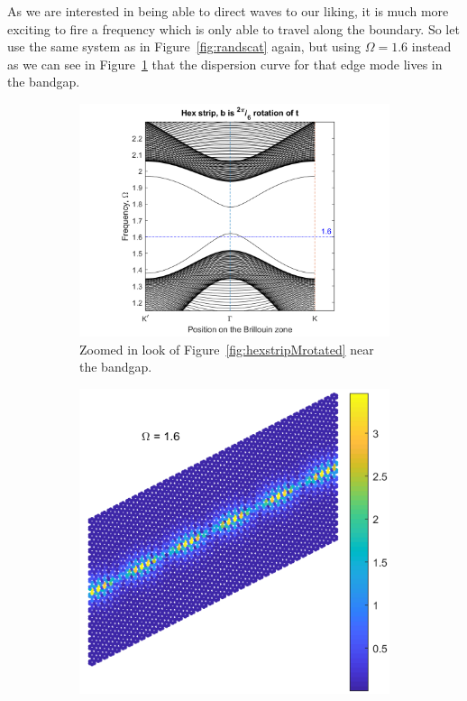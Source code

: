 As we are interested in being able to direct waves to our liking, it is much
more exciting to fire a frequency which is only able to travel along the
boundary. So let use the same system as in Figure~\ref{fig:randscat} again, but
using $\Omega = 1.6$ instead as we can see in
Figure~\ref{fig:hexstripMrotatedzooms1} that the dispersion curve for that edge
mode lives in the bandgap.

\begin{figure}
\centering
\begin{subfigure}[b]{.5\textwidth}
  \centering
  \includegraphics[width=1.1\linewidth]{imgs/hexstripperturbMrotatedzoom.png}
  \caption{Zoomed in look of Figure~\ref{fig:hexstripMrotated} near the bandgap.}
  \label{fig:hexstripMrotatedzooms1}
\end{subfigure}%
\begin{subfigure}[b]{.5\textwidth}
  \centering
  \includegraphics[width=1\linewidth]{imgs/hexstdrotstraight.png}

\end{subfigure}
\end{figure}
